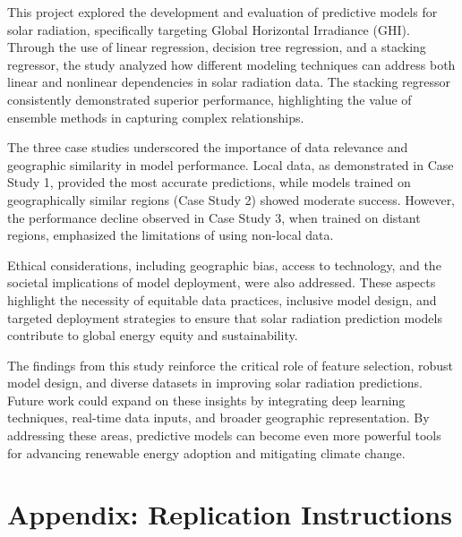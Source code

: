 \documentclass[10pt,twocolumn]{article}
\begin{document}
\begin{itemize}
This project explored the development and evaluation of predictive models for solar radiation, specifically targeting Global Horizontal Irradiance (GHI). Through the use of linear regression, decision tree regression, and a stacking regressor, the study analyzed how different modeling techniques can address both linear and nonlinear dependencies in solar radiation data. The stacking regressor consistently demonstrated superior performance, highlighting the value of ensemble methods in capturing complex relationships.

The three case studies underscored the importance of data relevance and geographic similarity in model performance. Local data, as demonstrated in Case Study 1, provided the most accurate predictions, while models trained on geographically similar regions (Case Study 2) showed moderate success. However, the performance decline observed in Case Study 3, when trained on distant regions, emphasized the limitations of using non-local data.

Ethical considerations, including geographic bias, access to technology, and the societal implications of model deployment, were also addressed. These aspects highlight the necessity of equitable data practices, inclusive model design, and targeted deployment strategies to ensure that solar radiation prediction models contribute to global energy equity and sustainability.

The findings from this study reinforce the critical role of feature selection, robust model design, and diverse datasets in improving solar radiation predictions. Future work could expand on these insights by integrating deep learning techniques, real-time data inputs, and broader geographic representation. By addressing these areas, predictive models can become even more powerful tools for advancing renewable energy adoption and mitigating climate change.
\pagebreak
\newpage
\appendix

\newpage\section*{Appendix: Replication Instructions}


\end{itemize}
\end{document}
